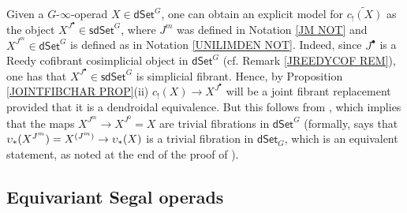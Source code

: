 \documentclass[a4paper,10pt
 ,draft
]{article}%
\begin{document}
\begin{remark}\label{CONCRECOM REM}
      Given a $G$-$\infty$-operad $X \in \mathsf{dSet}^G$,
      one can obtain an explicit model for $\widetilde{c_{!} (X)}$
      as the object $X^{J^{\bullet}} \in \mathsf{sdSet}^G$,
      where $J^{m}$ was defined in Notation \ref{JM NOT}
      and $X^{J^m}\in \mathsf{dSet}^G$ is defined as in 
      Notation \ref{UNILIMDEN NOT}.
      Indeed, since $J^{\bullet}$ is a Reedy cofibrant cosimplicial object in $\mathsf{dSet}^G$ (cf. Remark \ref{JREEDYCOF REM}),
      one has that $X^{J^{\bullet}} \in \mathsf{sdSet}^G$
      is simplicial fibrant.
      Hence, by Proposition \ref{JOINTFIBCHAR PROP}(ii)
      $c_{!}(X) \to X^{J^{\bullet}}$
      will be a joint fibrant replacement provided that it is a dendroidal equivalence.
      But this follows from \cite[Cor. 8.21]{Per18},
      which implies that the maps $X^{J^m} \to X^{J^0}=X$
      are trivial fibrations in $\mathsf{dSet}^G$
      (formally, \cite[Cor. 8.21]{Per18} says that $\upsilon_{\**}(X^{J^m}) = X^{(J^m)} \to \upsilon_{\**}(X)$
      is a trivial fibration in $\mathsf{dSet}_G$, which is an equivalent statement, as noted at the end of the proof of \cite[Thm. 8.22]{Per18}).
%
\end{remark}




\subsection{Equivariant Segal operads}\label{PREOP SEC}
\end{document}
